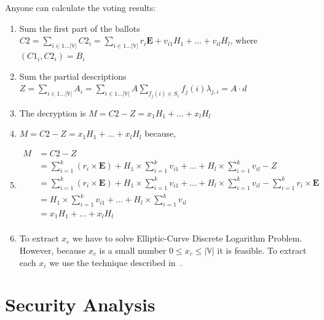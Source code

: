 \documentclass{article}
\begin{document}
Anyone can calculate the voting results:
\begin{enumerate}
    \item Sum the first part of the ballots $C2 = \sum_{i \in 1 \dots |\mathbb{V}|} C2_i = \sum_{i \in 1 \dots |\mathbb{V}|} r_i \mathbf{E} + v_{i1} H_1 + \dots + v_{il} H_l$, where $(C1_i,C2_i)=B_i$
    \item Sum the partial descriptions $Z=\sum_{i \in 1 \dots |\mathbb{V}|} A_i = \sum_{i \in 1 \dots |\mathbb{V}|} A \sum_{f_j(i) \in S_i} f_j(i) \lambda_{j,i} = A \cdot d$
    \item The decryption is $M=C2-Z=x_1 H_1 + \dots + x_l H_l$
    \item $M=C2-Z=x_1 H_1 + \dots + x_l H_l$ because,
    \item $\begin{aligned} M&=C2-Z \\
        &= \sum_{i=1}^k ( r_{i} \times \mathbf{E}) + H_1 \times \sum_{i=1}^k v_{i1} + \dots + H_l \times \sum_{i=1}^k v_{il} - Z\\
        &= \sum_{i=1}^k ( r_{i} \times \mathbf{E}) + H_1 \times \sum_{i=1}^k v_{i1} + \dots + H_l \times \sum_{i=1}^k v_{il} - \sum_{i=1}^k r_{i} \times \mathbf{E}\\
        &= H_1 \times \sum_{i=1}^k v_{i1} + \dots + H_l \times \sum_{i=1}^k v_{il}\\
        &= x_1 H_1 + \dots + x_l H_l\\
        \end{aligned}$
    \item To extract $x_c$ we have to solve Elliptic-Curve Discrete Logarithm Problem. However, because $x_c$ is a small number $0 \leq x_c \leq |\mathbb{V}|$ it is feasible. To extract each $x_i$ we use the technique described in~\cite{haoAnonymousVotingTworound2010}.
\end{enumerate}

\section{Security Analysis}
\end{document}
